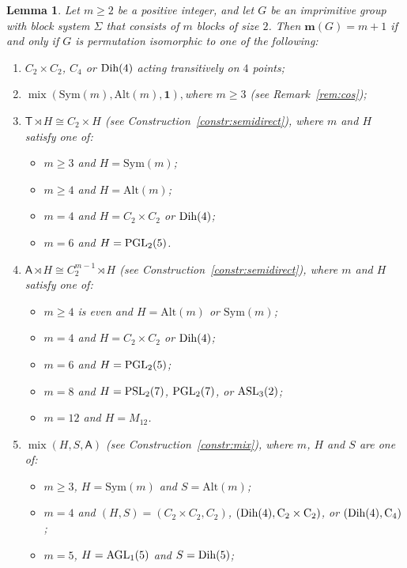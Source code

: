 \documentclass[a4paper]{amsart}
\newcommand{\Sym}{\mathrm{Sym}}
\newcommand{\Alt}{\mathrm{Alt}}
\newcommand{\m}{\mathbf{m}}
\newcommand{\mix}{\mathop{\mathrm{mix}}}
\newcommand{\A}{\mathsf{A}}
\newcommand{\PGL}{\rm PGL}
\newcommand{\PSL}{\rm PSL}
\newcommand{\Dih}{\rm Dih}
\newcommand{\ASL}{\rm ASL}
\newcommand{\AGL}{\rm AGL}
\newcommand{\one}{\mathbf{1}}
\newtheorem{lemma}[theorem]{Lemma}
\theoremstyle{definition}
\begin{document}
\begin{lemma}
\label{lemma:caseA}
    Let $m \ge 2$ 
    be a positive integer, and let $G$ be an imprimitive group with block system $\Sigma$ that consists of $m$ blocks of size $2$. 
    Then $\m(G) = m+1$ if and only if $G$ is permutation isomorphic to one of the following:
    \begin{enumerate}[$(i)$]
        \item $C_2\times C_2$, $C_4$ or $\Dih(4)$ acting transitively on $4$ points;
        \item $\mix(\Sym(m),\Alt(m),\one), $where $m\ge 3$ (see Remark~\ref{rem:cos});
        \item $\mathsf{T}\rtimes H \cong  C_2 \times H$ (see Construction~\ref{constr:semidirect}), where $m$ and $H$ satisfy one of:
          \begin{itemize}
             \item $m\ge 3$ and $H=\Sym(m)$;
             \item $m\ge 4$ and $H=\Alt(m)$; 
             \item $m=4$ and $H=C_2\times C_2$ or $\Dih(4)$;
             \item $m=6$ and $H=\PGL_2(5)$.
          \end{itemize} 
        \item $\A\rtimes H \cong  C_2^{m-1} \rtimes H$ (see Construction~\ref{constr:semidirect}), where $m$ and $H$ satisfy one of:
          \begin{itemize}
             \item $m\ge 4$ is even and $H=\Alt(m)$ or $\Sym(m)$; 
             \item $m=4$ and $H=C_2\times C_2$  or $\Dih(4)$;
             \item $m=6$ and $H=\PGL_2(5)$;
             \item $m=8$ and $H=\PSL_2(7)$, $\PGL_2(7)$, or $\ASL_3(2)$;
             \item $m=12$ and $H=M_{12}$. 
          \end{itemize}
        \item $\mix(H,S,\A)$ (see Construction~\ref{constr:mix}), where $m$, $H$ and $S$ are one of:
          \begin{itemize}
             \item $m\ge 3$, $H=\Sym(m)$ and $S=\Alt(m)$;
             \item $m=4$ and $(H,S)=(C_2\times C_2,C_2)$, $(\Dih(4),C_2\times C_2)$, or $(\Dih(4),C_4)$;
             \item $m=5$, $H=\AGL_1(5)$ and $S=\Dih(5)$;                        

\end{itemize}
\end{enumerate}
\end{lemma}
\end{document}
